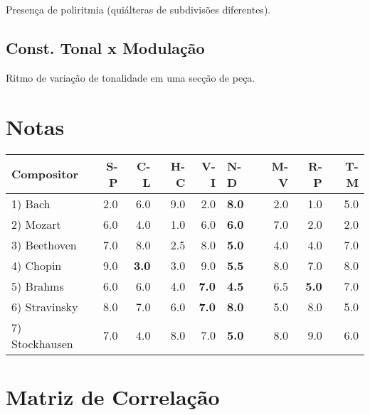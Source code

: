 \documentclass[11pt]{article}
\begin{document}
Presença de poliritmia (quiálteras de subdivisões diferentes).
\subsection{Const. Tonal x Modulação}
\label{sec-1_8}

Ritmo de variação de tonalidade em uma secção de peça.
\section{Notas}
\label{sec-2}



\begin{center}
\begin{tabular}{lrrrrlrrr}
 Compositor      &  S-P  &           C-L  &  H-C  &           V-I  &  N-D           &  M-V  &           R-P  &  T-M  \\
\hline
 1) Bach         &  2.0  &           6.0  &  9.0  &           2.0  &  \textbf{8.0}  &  2.0  &           1.0  &  5.0  \\
 2) Mozart       &  6.0  &           4.0  &  1.0  &           6.0  &  \textbf{6.0}  &  7.0  &           2.0  &  2.0  \\
 3) Beethoven    &  7.0  &           8.0  &  2.5  &           8.0  &  \textbf{5.0}  &  4.0  &           4.0  &  7.0  \\
 4) Chopin       &  9.0  &  \textbf{3.0}  &  3.0  &           9.0  &  \textbf{5.5}  &  8.0  &           7.0  &  8.0  \\
 5) Brahms       &  6.0  &           6.0  &  4.0  &  \textbf{7.0}  &  \textbf{4.5}  &  6.5  &  \textbf{5.0}  &  7.0  \\
 6) Stravinsky   &  8.0  &           7.0  &  6.0  &  \textbf{7.0}  &  \textbf{8.0}  &  5.0  &           8.0  &  5.0  \\
 7) Stockhausen  &  7.0  &           4.0  &  8.0  &           7.0  &  \textbf{5.0}  &  8.0  &           9.0  &  6.0  \\
\end{tabular}
\end{center}
\section{Matriz de Correlação}
\label{sec-3}
\end{document}

